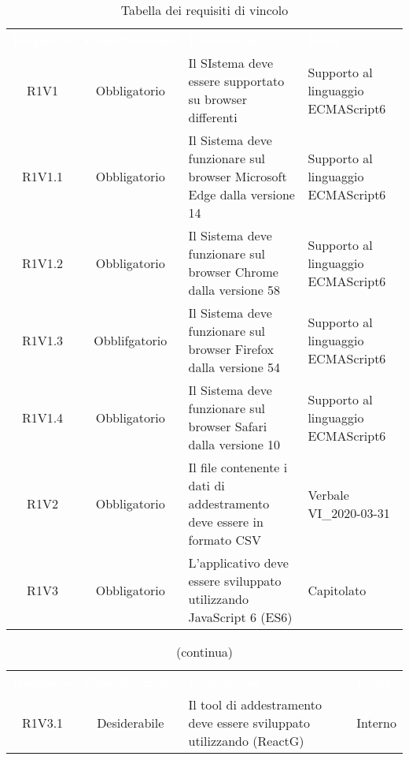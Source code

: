 \begin{table}[H]
\centering\renewcommand{\arraystretch}{1.5}
\caption{Tabella dei requisiti di vincolo}
\vspace{0.2cm}
\begin{tabular}{ c  c  p{4 cm} C{2.5 cm} }
\textcolor{white}{\textbf{Requisito}} & \textcolor{white}{\textbf{Classificazione}} & 
\textcolor{white}{\textbf{Descrizione}} & \textcolor{white}{\textbf{Fonti}} \\
R1V1 & Obbligatorio & Il SIstema deve essere supportato su browser differenti & Supporto al linguaggio ECMAScript6\\
R1V1.1 & Obbligatorio & Il Sistema deve funzionare sul browser Microsoft Edge dalla versione 14 & Supporto al linguaggio ECMAScript6\\
R1V1.2 & Obbligatorio & Il Sistema deve funzionare sul browser Chrome dalla versione 58 &  Supporto al linguaggio ECMAScript6\\
R1V1.3 & Obblifgatorio & Il Sistema deve funzionare sul browser Firefox dalla versione 54 &   Supporto al linguaggio ECMAScript6\\
R1V1.4 & Obbligatorio & Il Sistema deve funzionare sul browser Safari dalla versione 10 &  Supporto al linguaggio ECMAScript6\\
R1V2 & Obbligatorio & Il file contenente i dati di addestramento deve essere in formato CSV &  Verbale VI\_2020-03-31\\
R1V3 & Obbligatorio & L’applicativo deve essere sviluppato utilizzando JavaScript 6 (ES6) & Capitolato\\
\end{tabular}
\end{table}


\begin{table}[H]
\centering\renewcommand{\arraystretch}{1.5}
\caption{(continua)}
\vspace{0.2cm}
\begin{tabular}{ c  c  p{4 cm} C{2.5 cm} }
\textcolor{white}{\textbf{Requisito}} & \textcolor{white}{\textbf{Classificazione}} & 
\textcolor{white}{\textbf{Descrizione}} & \textcolor{white}{\textbf{Fonti}} \\
R1V3.1 & Desiderabile & Il tool di addestramento deve essere sviluppato utilizzando (ReactG) & Interno\\
\end{tabular}
\end{table}


